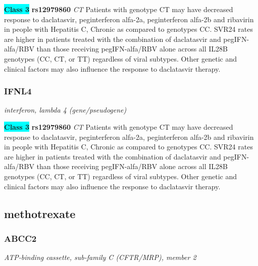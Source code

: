 \documentclass{report}
\begin{document}
\textbf{\colorbox{cyan} {Class 3}} \textbf{ rs12979860 } \textit{ CT }
Patients with genotype CT may have decreased response to daclatasvir, peginterferon alfa-2a, peginterferon alfa-2b and ribavirin in people with Hepatitis C, Chronic as compared to genotypes CC. SVR24 rates are higher in patients treated with the combination of daclatasvir and pegIFN-alfa/RBV than those receiving pegIFN-alfa/RBV alone across all IL28B genotypes (CC, CT, or TT) regardless of viral subtypes. Other genetic and clinical factors may also influence the response to daclatasvir therapy.\newline\subsubsection{ IFNL4 }
\textit{ interferon, lambda 4 (gene/pseudogene) }

\textbf{\colorbox{cyan} {Class 3}} \textbf{ rs12979860 } \textit{ CT }
Patients with genotype CT may have decreased response to daclatasvir, peginterferon alfa-2a, peginterferon alfa-2b and ribavirin in people with Hepatitis C, Chronic as compared to genotypes CC. SVR24 rates are higher in patients treated with the combination of daclatasvir and pegIFN-alfa/RBV than those receiving pegIFN-alfa/RBV alone across all IL28B genotypes (CC, CT, or TT) regardless of viral subtypes. Other genetic and clinical factors may also influence the response to daclatasvir therapy.\newline\subsection{ methotrexate }\subsubsection{ ABCC2 }
\textit{ ATP-binding cassette, sub-family C (CFTR/MRP), member 2 }
\end{document}
